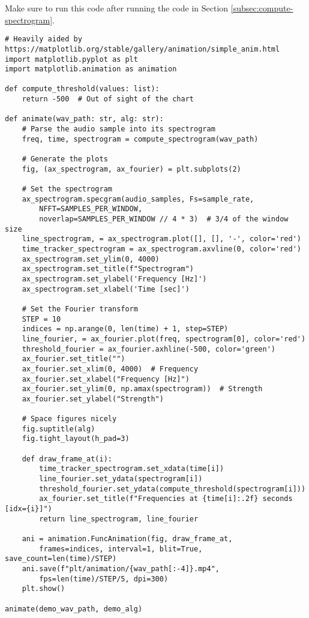 Make sure to run this code after running the code in Section \ref{subsec:compute-spectrogram}.
\begin{verbatim}
# Heavily aided by https://matplotlib.org/stable/gallery/animation/simple_anim.html
import matplotlib.pyplot as plt
import matplotlib.animation as animation

def compute_threshold(values: list):
    return -500  # Out of sight of the chart

def animate(wav_path: str, alg: str):
    # Parse the audio sample into its spectrogram
    freq, time, spectrogram = compute_spectrogram(wav_path)

    # Generate the plots
    fig, (ax_spectrogram, ax_fourier) = plt.subplots(2)

    # Set the spectrogram
    ax_spectrogram.specgram(audio_samples, Fs=sample_rate, 
        NFFT=SAMPLES_PER_WINDOW,
        noverlap=SAMPLES_PER_WINDOW // 4 * 3)  # 3/4 of the window size
    line_spectrogram, = ax_spectrogram.plot([], [], '-', color='red')
    time_tracker_spectrogram = ax_spectrogram.axvline(0, color='red')
    ax_spectrogram.set_ylim(0, 4000)
    ax_spectrogram.set_title(f"Spectrogram")
    ax_spectrogram.set_ylabel('Frequency [Hz]')
    ax_spectrogram.set_xlabel('Time [sec]')

    # Set the Fourier transform
    STEP = 10
    indices = np.arange(0, len(time) + 1, step=STEP)
    line_fourier, = ax_fourier.plot(freq, spectrogram[0], color='red')
    threshold_fourier = ax_fourier.axhline(-500, color='green')
    ax_fourier.set_title("")
    ax_fourier.set_xlim(0, 4000)  # Frequency
    ax_fourier.set_xlabel("Frequency [Hz]")
    ax_fourier.set_ylim(0, np.amax(spectrogram))  # Strength
    ax_fourier.set_ylabel("Strength")

    # Space figures nicely
    fig.suptitle(alg)
    fig.tight_layout(h_pad=3)

    def draw_frame_at(i):
        time_tracker_spectrogram.set_xdata(time[i])
        line_fourier.set_ydata(spectrogram[i])
        threshold_fourier.set_ydata(compute_threshold(spectrogram[i]))
        ax_fourier.set_title(f"Frequencies at {time[i]:.2f} seconds [idx={i}]")
        return line_spectrogram, line_fourier

    ani = animation.FuncAnimation(fig, draw_frame_at,
        frames=indices, interval=1, blit=True, save_count=len(time)/STEP)
    ani.save(f"plt/animation/{wav_path[:-4]}.mp4",
        fps=len(time)/STEP/5, dpi=300)
    plt.show()

animate(demo_wav_path, demo_alg)
\end{verbatim}


